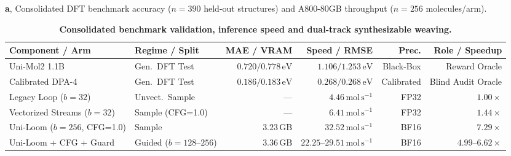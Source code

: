 \documentclass[11pt,a4paper]{article}
\begin{document}
\begin{table}[!t]
  \centering
  \caption{\textbf{Consolidated benchmark validation, inference speed and dual-track synthesizable weaving.}}
  \label{tab:main}
  \scriptsize
  \setlength{\tabcolsep}{2.0pt}
  \textbf{a}, Consolidated DFT benchmark accuracy ($n=390$ held-out structures) and A800-80GB throughput ($n=256$ molecules/arm).\\[2pt]
  \begin{tabular}{llrrrr}
    \toprule
    Component / Arm & Regime / Split & MAE / VRAM & Speed / RMSE & Prec. & Role / Speedup \\
    \midrule
    Uni-Mol2 1.1B & Gen.\ DFT Test & $0.720 / 0.778\,\text{eV}$ & $1.106 / 1.253\,\text{eV}$ & Black-Box & Reward Oracle \\
    Calibrated DPA-4 & Gen.\ DFT Test & $0.186 / 0.183\,\text{eV}$ & $0.268 / 0.268\,\text{eV}$ & Calibrated & Blind Audit Oracle \\
    Legacy Loop ($b=32$) & Unvect.\ Sample & --- & $4.46\,\text{mol}\,\text{s}^{-1}$ & FP32 & $1.00\times$ \\
    Vectorized Streams ($b=32$) & Sample (CFG=1.0) & --- & $6.41\,\text{mol}\,\text{s}^{-1}$ & FP32 & $1.44\times$ \\
    Uni-Loom ($b=256$, CFG=1.0) & Sample & $3.23\,\text{GB}$ & $32.52\,\text{mol}\,\text{s}^{-1}$ & BF16 & $7.29\times$ \\
    Uni-Loom + CFG + Guard & Guided ($b=128$--$256$) & $3.36\,\text{GB}$ & $22.25$--$29.51\,\text{mol}\,\text{s}^{-1}$ & BF16 & $4.99$--$6.62\times$ \\
    \bottomrule
  \end{tabular}


\end{table}
\end{document}
